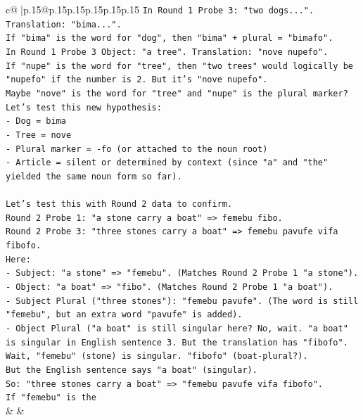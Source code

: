 \documentclass{article}
\begin{document}
{\begin{supertabular}{c@{$\;$}|p{.15\linewidth}@{}p{.15\linewidth}p{.15\linewidth}p{.15\linewidth}p{.15\linewidth}p{.15\linewidth}}
{{{\texttt{In Round 1 Probe 3: "two dogs...". Translation: "bima...".} \\
\texttt{If "bima" is the word for "dog", then "bima" + plural = "bimafo".} \\
\texttt{In Round 1 Probe 3 Object: "a tree". Translation: "nove nupefo".} \\
\texttt{If "nupe" is the word for "tree", then "two trees" would logically be "nupefo" if the number is 2. But it's "nove nupefo".} \\
\texttt{Maybe "nove" is the word for "tree" and "nupe" is the plural marker?} \\
\texttt{Let's test this new hypothesis:} \\
\texttt{{-} Dog = bima} \\
\texttt{{-} Tree = nove} \\
\texttt{{-} Plural marker = {-}fo (or attached to the noun root)} \\
\texttt{{-} Article = silent or determined by context (since "a" and "the" yielded the same noun form so far).} \\
\\ 
\texttt{Let's test this with Round 2 data to confirm.} \\
\texttt{Round 2 Probe 1: "a stone carry a boat" => femebu fibo.} \\
\texttt{Round 2 Probe 3: "three stones carry a boat" => femebu pavufe vifa fibofo.} \\
\texttt{Here:} \\
\texttt{{-} Subject: "a stone" => "femebu". (Matches Round 2 Probe 1 "a stone").} \\
\texttt{{-} Object: "a boat" => "fibo". (Matches Round 2 Probe 1 "a boat").} \\
\texttt{{-} Subject Plural ("three stones"): "femebu pavufe". (The word is still "femebu", but an extra word "pavufe" is added).} \\
\texttt{{-} Object Plural ("a boat" is still singular here? No, wait. "a boat" is singular in English sentence 3. But the translation has "fibofo".} \\
\texttt{Wait, "femebu" (stone) is singular. "fibofo" (boat{-}plural?).} \\
\texttt{But the English sentence says "a boat" (singular).} \\
\texttt{So: "three stones carry a boat" => "femebu pavufe vifa fibofo".} \\
\texttt{If "femebu" is the} \\
            }
        }
    }
    & & \\ \\


\end{supertabular}}
\end{document}

